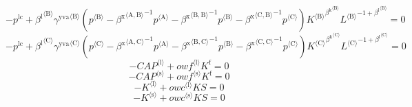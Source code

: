 \begin{equation}
-p^{\mathrm{lc}} + {{\beta^{\mathrm{l}}}^{\langle \mathrm{\mathrm{B}}\rangle}} {{\gamma^{\mathrm{yva}}}^{\langle \mathrm{\mathrm{B}}\rangle}} \left({p}^{\langle \mathrm{B}\rangle} - {{\beta^{\mathrm{x}}}^{\langle \mathrm{\mathrm{A}},\mathrm{\mathrm{B}}\rangle}}^{-1} {{p}^{\langle \mathrm{A}\rangle}} - {{\beta^{\mathrm{x}}}^{\langle \mathrm{\mathrm{B}},\mathrm{\mathrm{B}}\rangle}}^{-1} {{p}^{\langle \mathrm{B}\rangle}} - {{\beta^{\mathrm{x}}}^{\langle \mathrm{\mathrm{C}},\mathrm{\mathrm{B}}\rangle}}^{-1} {{p}^{\langle \mathrm{C}\rangle}}\right) {{{K}^{\langle \mathrm{B}\rangle}}^{{\beta^{\mathrm{k}}}^{\langle \mathrm{\mathrm{B}}\rangle}}} {{{L}^{\langle \mathrm{B}\rangle}}^{-1 + {\beta^{\mathrm{l}}}^{\langle \mathrm{\mathrm{B}}\rangle}}} = 0
\end{equation}
\begin{equation}
-p^{\mathrm{lc}} + {{\beta^{\mathrm{l}}}^{\langle \mathrm{\mathrm{C}}\rangle}} {{\gamma^{\mathrm{yva}}}^{\langle \mathrm{\mathrm{C}}\rangle}} \left({p}^{\langle \mathrm{C}\rangle} - {{\beta^{\mathrm{x}}}^{\langle \mathrm{\mathrm{A}},\mathrm{\mathrm{C}}\rangle}}^{-1} {{p}^{\langle \mathrm{A}\rangle}} - {{\beta^{\mathrm{x}}}^{\langle \mathrm{\mathrm{B}},\mathrm{\mathrm{C}}\rangle}}^{-1} {{p}^{\langle \mathrm{B}\rangle}} - {{\beta^{\mathrm{x}}}^{\langle \mathrm{\mathrm{C}},\mathrm{\mathrm{C}}\rangle}}^{-1} {{p}^{\langle \mathrm{C}\rangle}}\right) {{{K}^{\langle \mathrm{C}\rangle}}^{{\beta^{\mathrm{k}}}^{\langle \mathrm{\mathrm{C}}\rangle}}} {{{L}^{\langle \mathrm{C}\rangle}}^{-1 + {\beta^{\mathrm{l}}}^{\langle \mathrm{\mathrm{C}}\rangle}}} = 0
\end{equation}
\begin{equation}
-{{C\!A\!P}}^{\langle \mathrm{l}\rangle} + {{{o\!w\!f}}^{\langle \mathrm{\mathrm{l}}\rangle}} {K^{\mathrm{f}}} = 0
\end{equation}
\begin{equation}
-{{C\!A\!P}}^{\langle \mathrm{s}\rangle} + {{{o\!w\!f}}^{\langle \mathrm{\mathrm{s}}\rangle}} {K^{\mathrm{f}}} = 0
\end{equation}
\begin{equation}
-{K}^{\langle \mathrm{l}\rangle} + {{{o\!w\!c}}^{\langle \mathrm{\mathrm{l}}\rangle}} {{K\!S}} = 0
\end{equation}
\begin{equation}
-{K}^{\langle \mathrm{s}\rangle} + {{{o\!w\!c}}^{\langle \mathrm{\mathrm{s}}\rangle}} {{K\!S}} = 0
\end{equation}
